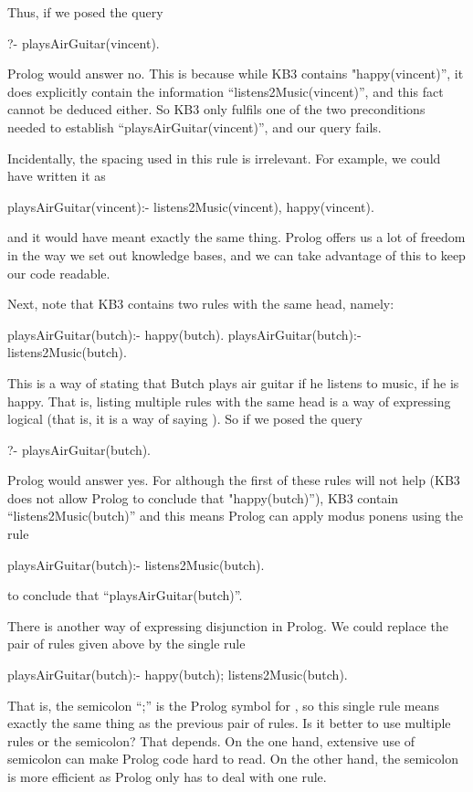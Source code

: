 Thus, if we posed the query
\begin{LPNcodedisplay}
?- playsAirGuitar(vincent).
\end{LPNcodedisplay}
Prolog would answer no.  This is because while KB3 contains
"happy(vincent)'', it does  explicitly contain the
information ``listens2Music(vincent)'', and this fact cannot be deduced
either.  So KB3 only fulfils one of the two preconditions needed to
establish ``playsAirGuitar(vincent)'', and our query fails.

Incidentally, the spacing used in this rule is irrelevant. For
example, we could have written it as
\begin{LPNcodedisplay}
playsAirGuitar(vincent):- listens2Music(vincent),
			   happy(vincent).
\end{LPNcodedisplay}
and it would have meant exactly the same thing. Prolog offers us a lot
of freedom in the way we set out knowledge bases, and we can take
advantage of this to keep our code readable.

Next, note that KB3 contains two rules with  the same
head, namely:
\begin{LPNcodedisplay}
playsAirGuitar(butch):-
   happy(butch).
playsAirGuitar(butch):-
   listens2Music(butch).
\end{LPNcodedisplay}
This is a way of stating that Butch plays air guitar
 if he listens to music,  if he is happy.
That is, listing multiple rules with the same head is a way of
expressing logical  (that is, it is a way of
saying ).  So if we posed the query
\begin{LPNcodedisplay}
?- playsAirGuitar(butch).
\end{LPNcodedisplay}
Prolog would answer yes. For although the first of these rules
will not help (KB3 does not allow Prolog to conclude that
"happy(butch)''), KB3  contain ``listens2Music(butch)''
and this means Prolog can apply modus ponens using the rule
\begin{LPNcodedisplay}
playsAirGuitar(butch):-
   listens2Music(butch).
\end{LPNcodedisplay}
to conclude that ``playsAirGuitar(butch)''.

There is another way of expressing disjunction in Prolog. We could
replace the pair of rules given above by the single rule
\begin{LPNcodedisplay}
playsAirGuitar(butch):-
   happy(butch);
   listens2Music(butch).
\end{LPNcodedisplay}
That is, the semicolon ``;'' is the Prolog symbol for , so
this single rule means exactly the same thing as the previous pair of
rules. Is it better to use multiple rules or the semicolon?  That
depends. On the one hand, extensive use of semicolon can make Prolog
code hard to read. On the other hand, the semicolon is more efficient
as Prolog only has to deal with one rule.

